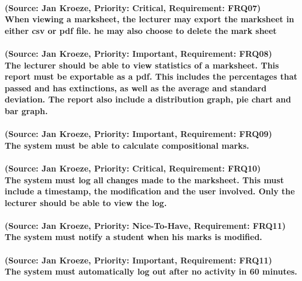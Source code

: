 \documentclass[12pt]{article}
\begin{document}
  \paragraph{ (Source: Jan Kroeze, Priority: Critical, Requirement: FRQ07) \\
  When viewing a marksheet, the lecturer may export the marksheet in either csv or pdf file. he may also choose to delete the mark sheet}
  \paragraph{ (Source: Jan Kroeze, Priority: Important, Requirement: FRQ08) \\
  The lecturer should be able to view statistics of a marksheet.  This report must be exportable as a pdf. This includes the percentages that passed and has extinctions, as well as the average and standard deviation. The report also include a distribution graph, pie chart and bar graph.}
  \paragraph{ (Source: Jan Kroeze, Priority: Important, Requirement: FRQ09) \\
  The system must be able to calculate compositional marks.}
  \paragraph{ (Source: Jan Kroeze, Priority: Critical, Requirement: FRQ10) \\
  The system must log all changes made to the marksheet. This must include a timestamp, the modification and the user involved. Only the lecturer should be able to view the log.}
  \paragraph{ (Source: Jan Kroeze, Priority: Nice-To-Have, Requirement: FRQ11) \\
  The system must notify a student when his marks is modified.}
  \paragraph{ (Source: Jan Kroeze, Priority: Important, Requirement: FRQ11) \\
  The system must automatically log out after no activity in 60 minutes.}
\end{document}

